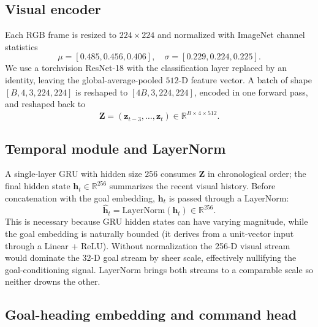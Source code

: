 \documentclass[10pt,twocolumn,letterpaper]{article}
\begin{document}
\subsection{Visual encoder}

Each RGB frame is resized to $224\times224$ and normalized with ImageNet channel statistics
\begin{equation}
\label{eq:norm}
\mu = [0.485, 0.456, 0.406],\quad \sigma = [0.229, 0.224, 0.225].
\end{equation}
We use a torchvision ResNet-18 with the classification layer replaced by an identity, leaving the global-average-pooled $512$-D feature vector. A batch of shape $[B,4,3,224,224]$ is reshaped to $[4B,3,224,224]$, encoded in one forward pass, and reshaped back to
\begin{equation}
\label{eq:features}
\mathbf{Z} = (\mathbf{z}_{t-3}, \ldots, \mathbf{z}_t) \in \mathbb{R}^{B\times 4 \times 512}.
\end{equation}

\subsection{Temporal module and LayerNorm}

A single-layer GRU with hidden size $256$ consumes $\mathbf{Z}$ in chronological order; the final hidden state $\mathbf{h}_t \in \mathbb{R}^{256}$ summarizes the recent visual history. Before concatenation with the goal embedding, $\mathbf{h}_t$ is passed through a LayerNorm:
\begin{equation}
\hat{\mathbf{h}}_t = \mathrm{LayerNorm}(\mathbf{h}_t) \in \mathbb{R}^{256}.
\end{equation}
This is necessary because GRU hidden states can have varying magnitude, while the goal embedding is naturally bounded (it derives from a unit-vector input through a Linear + ReLU). Without normalization the 256-D visual stream would dominate the 32-D goal stream by sheer scale, effectively nullifying the goal-conditioning signal. LayerNorm brings both streams to a comparable scale so neither drowns the other.

\subsection{Goal-heading embedding and command head}
\end{document}
